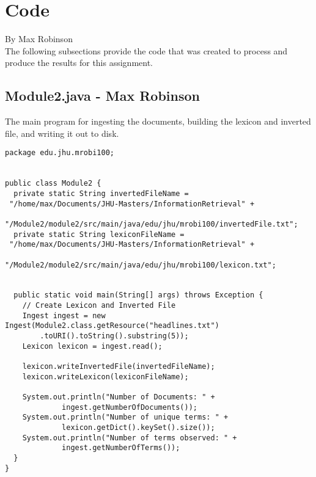 \documentclass{article}
\begin{document}
\section{Code}
By Max Robinson \\
The following subsections provide the code that was created to process and produce the results for this assignment. 

\subsection{Module2.java - Max Robinson}
The main program for ingesting the documents, building the lexicon and inverted file, and writing it out to disk. 
\begin{verbatim}
package edu.jhu.mrobi100;


public class Module2 {
  private static String invertedFileName =
 "/home/max/Documents/JHU-Masters/InformationRetrieval" +
          "/Module2/module2/src/main/java/edu/jhu/mrobi100/invertedFile.txt";
  private static String lexiconFileName =
 "/home/max/Documents/JHU-Masters/InformationRetrieval" +
          "/Module2/module2/src/main/java/edu/jhu/mrobi100/lexicon.txt";


  public static void main(String[] args) throws Exception {
    // Create Lexicon and Inverted File
    Ingest ingest = new Ingest(Module2.class.getResource("headlines.txt")
        .toURI().toString().substring(5));
    Lexicon lexicon = ingest.read();

    lexicon.writeInvertedFile(invertedFileName);
    lexicon.writeLexicon(lexiconFileName);

    System.out.println("Number of Documents: " +
             ingest.getNumberOfDocuments());
    System.out.println("Number of unique terms: " +
             lexicon.getDict().keySet().size());
    System.out.println("Number of terms observed: " +
             ingest.getNumberOfTerms());
  }
}

\end{verbatim}
\end{document}
